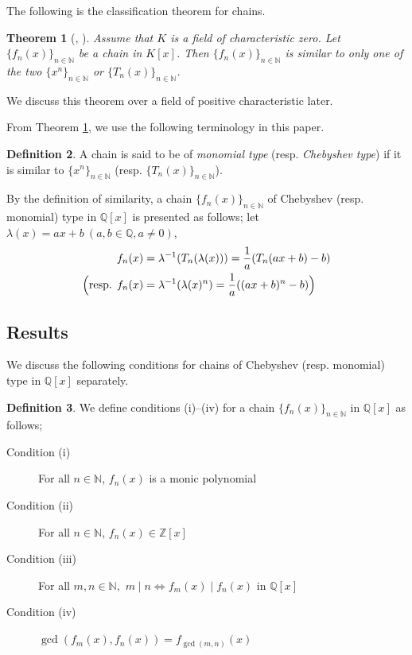 \documentclass[a4paper, 11pt]{amsart}
\numberwithin{equation}{section}
\newtheorem{thm}{Theorem}[section]
\theoremstyle{definition}
\newtheorem{defn}[thm]{Definition}
\newcommand{\Z}{\mathbb{Z}}
\newcommand{\N}{\mathbb{N}}
\newcommand{\Q}{\mathbb{Q}}
\begin{document}
The following is the classification theorem for chains.

\begin{thm}[\cite{BT}, \cite{J}]\label{class-chain}
Assume that $K$ is a field of characteristic zero.
Let $\{f_n(x)\}_{n \in \N}$ be a chain in $K[x]$.
Then $\{f_n(x)\}_{n \in \N}$ is similar to only one of the two $\{x^n\}_{n \in \N}$ or $\{T_n(x)\}_{n \in \N}$.
\end{thm}

We discuss this theorem over a field of positive characteristic later.

From Theorem \ref{class-chain}, we use the following terminology in this paper.

\begin{defn}
A chain is said to be of \textit{monomial type} (resp. \textit{Chebyshev type}) if it is similar to $\{x^n\}_{n\in \N}$ (resp. $\{T_n(x)\}_{n\in \N}$).
\end{defn}

By the definition of similarity, a chain $\{f_n(x)\}_{n \in \N}$ of Chebyshev (resp. monomial) type in $\Q[x]$ is presented as follows; let $\lambda(x)=ax+b\ (a, b\in \Q, a\neq 0)$,
\begin{align*}
f_n(x) &=\lambda^{-1}( T_n(\lambda(x)))= \frac{1}{a} (T_n(ax + b) - b)\\
\Bigl( \text{resp. } f_n(x) &=\lambda^{-1}( \lambda(x)^n)= \frac{1}{a} ((ax + b)^n - b) \Bigr)
\end{align*}




\subsection{Results}
We discuss the following conditions for chains of Chebyshev (resp. monomial) type in $\Q[x]$ separately.
\begin{defn}\label{conditions}
We define conditions (i)--(iv) for a chain $\{f_n(x)\}_{n \in \N}$ in $\Q[x]$ as follows;
\begin{description}
\item[Condition (i)\label{itm:i}]
For all $n \in \N$, $f_n(x)$ is a monic polynomial  
\item[Condition (ii)\label{itm:ii}]
For all $n \in \N$, $f_n(x) \in \Z[x]$  
\item[Condition (iii)\label{itm:iii}]
For all $m, n \in \N, $ $m \mid n \Leftrightarrow f_m(x) \mid f_n(x)$ in $\Q[x]$ 
\item[Condition (iv)\label{itm:iv}] 
$\gcd(f_m(x), f_n(x)) = f_{\gcd(m, n)}(x)$  
\end{description}
\end{defn}
\end{document}
